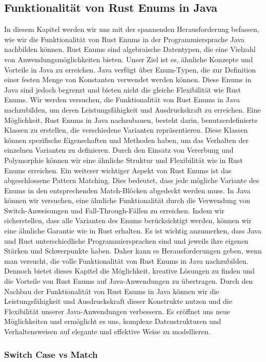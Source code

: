 \documentclass[a4paper, 1ppt]{article}
\begin{document}
\subsection{Funktionalität von Rust Enums in Java}
In diesem Kapitel werden wir uns mit der spannenden Herausforderung befassen, wie wir die Funktionalität von Rust Enums in der Programmiersprache Java nachbilden können. Rust Enums sind algebraische Datentypen, die eine Vielzahl von Anwendungsmöglichkeiten bieten. Unser Ziel ist es, ähnliche Konzepte und Vorteile in Java zu erreichen.
Java verfügt über Enum-Typen, die zur Definition einer festen Menge von Konstanten verwendet werden können. Diese Enums in Java sind jedoch begrenzt und bieten nicht die gleiche Flexibilität wie Rust Enums. Wir werden versuchen, die Funktionalität von Rust Enums in Java nachzubilden, um deren Leistungsfähigkeit und Ausdruckskraft zu erreichen.
Eine Möglichkeit, Rust Enums in Java nachzubauen, besteht darin, benutzerdefinierte Klassen zu erstellen, die verschiedene Varianten repräsentieren. Diese Klassen können spezifische Eigenschaften und Methoden haben, um das Verhalten der einzelnen Varianten zu definieren. Durch den Einsatz von Vererbung und Polymorphie können wir eine ähnliche Struktur und Flexibilität wie in Rust Enums erreichen.
Ein weiterer wichtiger Aspekt von Rust Enums ist das abgeschlossene Pattern Matching. Dies bedeutet, dass jede mögliche Variante des Enums in den entsprechenden Match-Blöcken abgedeckt werden muss. In Java können wir versuchen, eine ähnliche Funktionalität durch die Verwendung von Switch-Anweisungen und Fall-Through-Fällen zu erreichen. Indem wir sicherstellen, dass alle Varianten des Enums berücksichtigt werden, können wir eine ähnliche Garantie wie in Rust erhalten.
Es ist wichtig anzumerken, dass Java und Rust unterschiedliche Programmiersprachen sind und jeweils ihre eigenen Stärken und Schwerpunkte haben. Daher kann es Herausforderungen geben, wenn man versucht, die volle Funktionalität von Rust Enums in Java nachzubilden. Dennoch bietet dieses Kapitel die Möglichkeit, kreative Lösungen zu finden und die Vorteile von Rust Enums auf Java-Anwendungen zu übertragen.
Durch den Nachbau der Funktionalität von Rust Enums in Java können wir die Leistungsfähigkeit und Ausdruckskraft dieser Konstrukte nutzen und die Flexibilität unserer Java-Anwendungen verbessern. Es eröffnet uns neue Möglichkeiten und ermöglicht es uns, komplexe Datenstrukturen und Verhaltensweisen auf elegante und effektive Weise zu modellieren.
\subsubsection{Switch Case vs Match}
\end{document}

